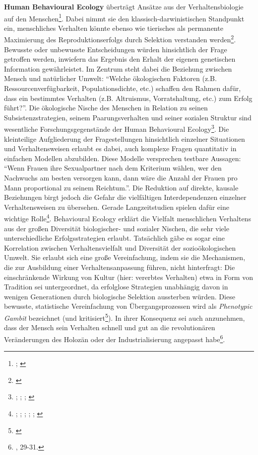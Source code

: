 \documentclass[openany,twoside,twocolumn]{book}
\let\rmarkdownfootnote\footnote%
\def\footnote{\protect\rmarkdownfootnote}
\begin{document}
\textbf{Human Behavioural Ecology} überträgt Ansätze aus der
Verhaltensbiologie auf den Menschen\footnote{\textcite{smith_cultural_1992};
  \textcite{winterhalder_analyzing_2000}}. Dabei nimmt sie den
klassisch-darwinistischen Standpunkt ein, menschliches Verhalten könnte
ebenso wie tierisches als permanente Maximierung des
Reproduktionserfolgs durch Selektion verstanden werden\footnote{\textcite{creanza_cultural_2017}}.
Bewusste oder unbewusste Entscheidungen würden hinsichtlich der Frage
getroffen werden, inwiefern das Ergebnis den Erhalt der eigenen
genetischen Information gewährleistet. Im Zentrum steht dabei die
Beziehung zwischen Mensch und natürlicher Umwelt: ``Welche ökologischen
Faktoren (z.B. Ressourcenverfügbarkeit, Populationsdichte, etc.)
schaffen den Rahmen dafür, dass ein bestimmtes Verhalten (z.B.
Altruismus, Vorratshaltung, etc.) zum Erfolg führt?''. Die ökologische
Nische des Menschen in Relation zu seinen Subsistenzstrategien, seinem
Paarungsverhalten und seiner sozialen Struktur sind wesentliche
Forschungsgegenstände der Human Behavioural Ecology\footnote{\textcite{henrich_search_2001};
  \textcite{kaplan_theory_2000}; \textcite{voland_evolutionary_1998};
  \textcite{winterhalder_risk-senstive_1999}}. Die kleinteilige
Aufgliederung der Fragestellungen hinsichtlich einzelner Situationen und
Verhaltensweisen erlaubt es dabei, auch komplexe Fragen quantitativ in
einfachen Modellen abzubilden. Diese Modelle versprechen testbare
Aussagen: ``Wenn Frauen ihre Sexualpartner nach dem Kriterium wählen,
wer den Nachwuchs am besten versorgen kann, dann wäre die Anzahl der
Frauen pro Mann proportional zu seinem Reichtum.''. Die Reduktion auf
direkte, kausale Beziehungen birgt jedoch die Gefahr die vielfältigen
Interdependenzen einzelner Verhaltensweisen zu übersehen. Gerade
Langzeitstudien spielen dafür eine wichtige Rolle\footnote{\textcite{belovsky_optimal_1988};
  \textcite{broughton_widening_1997}; \textcite{low_population_1993};
  \textcite{stiner_paleolithic_1999}; \textcite{stiner_tortoise_2000};
  \textcite{winterhalder_population_1988}}. Behavioural Ecology erklärt
die Vielfalt menschlichen Verhaltens aus der großen Diversität
biologischer- und sozialer Nischen, die sehr viele unterschiedliche
Erfolgsstrategien erlaubt. Tatsächlich gäbe es sogar eine Korrelation
zwischen Verhaltensvielfalt und Diversität der sozioökologischen Umwelt.
Sie erlaubt sich eine große Vereinfachung, indem sie die Mechanismen,
die zur Ausbildung einer Verhaltensanpassung führen, nicht hinterfragt:
Die einschränkende Wirkung von Kultur (hier: vererbtes Verhalten) etwa
in Form von Tradition sei untergeordnet, da erfolglose Strategien
unabhängig davon in wenigen Generationen durch biologische Selektion
aussterben würden. Diese bewusste, statistische Vereinfachung von
Übergangsprozessen wird als \emph{Phenotypic Gambit} bezeichnet (und
kritisiert\footnote{\textcite{rubin_phenotypic_2016}}). In ihrer
Konsequenz sei auch anzunehmen, dass der Mensch sein Verhalten schnell
und gut an die revolutionären Veränderungen des Holozän oder der
Industrialisierung angepasst habe\footnote{\textcite{SmithThreestylesevolutionary2000},
  29-31.}.
\end{document}
